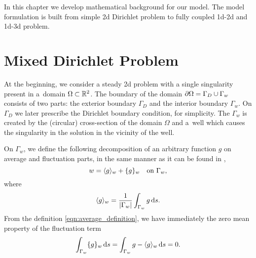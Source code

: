 
% 

In this chapter we develop mathematical background for our model.
The model formulation is built from simple 2d Dirichlet problem to fully coupled 1d-2d and 1d-3d problem.



\section{Mixed Dirichlet Problem}

At the beginning, we consider a steady 2d problem with a single singularity present in a~domain $\Omega\subset\mathbb{R}^2$.
The boundary of the domain $\partial\Omega=\Gamma_D \cup \Gamma_w$ consists of two parts: the exterior boundary $\Gamma_D$
and the interior boundary $\Gamma_w$. On $\Gamma_D$ we later prescribe the Dirichlet boundary condition, for simplicity.
The $\Gamma_w$ is created by the (circular) cross-section of the domain $\Omega$ and a~well which causes the singularity
in the solution in the vicinity of the well.

On $\Gamma_w$, we define the following decomposition of an arbitrary function $g$ on average and fluctuation parts, 
in the same manner as it can be found in \cite{koppl_vidotto_2018},
\begin{equation}\label{eqn:average_definition}
    w = \langle g\rangle_w + \{g\}_w \quad \textrm{on } \Gamma_w,
\end{equation}
where
\begin{equation}
    \langle g\rangle_w = \frac{1}{{\left|\Gamma_w\right|}} \int_{\Gamma_w} g \,{\rm d} s.
\end{equation}
From the definition \eqref{eqn:average_definition}, we have immediately the zero mean property of the fluctuation term
\begin{equation}
\int_{\Gamma_w} \{g\}_w \,{\rm d} s = \int_{\Gamma_w} g - \langle g\rangle_w \,{\rm d} s = 0.
\end{equation}

